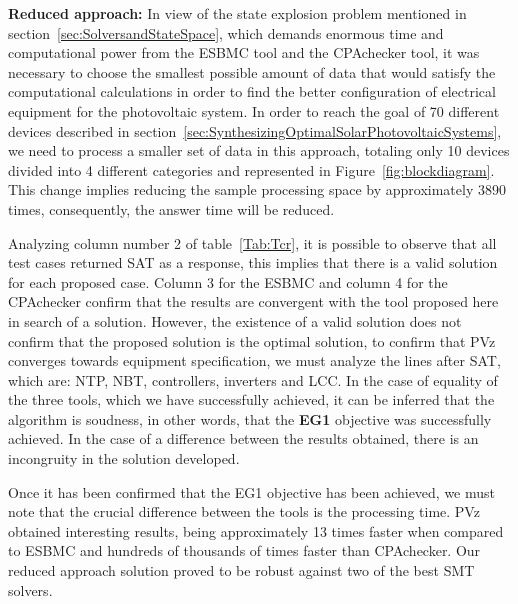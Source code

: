 \documentclass[10pt,journal,compsoc]{IEEEtran}
\begin{document}

\textbf{Reduced approach:} In view of the state explosion problem mentioned in section~\ref{sec:SolversandStateSpace}, which demands enormous time and computational power from the ESBMC tool and the CPAchecker tool, it was necessary to choose the smallest possible amount of data that would satisfy the computational calculations in order to find the better configuration of electrical equipment for the photovoltaic system. In order to reach the goal of 70 different devices described in section~\ref{sec:SynthesizingOptimalSolarPhotovoltaicSystems}, we need to process a smaller set of data in this approach, totaling only 10 devices divided into 4 different categories and represented in Figure~\ref{fig:blockdiagram}. This change implies reducing the sample processing space by approximately 3890 times, consequently, the answer time will be reduced.

Analyzing column number 2 of table~\ref{Tab:Tcr}, it is possible to observe that all test cases returned SAT as a response, this implies that there is a valid solution for each proposed case. Column 3 for the ESBMC and column 4 for the CPAchecker confirm that the results are convergent with the tool proposed here in search of a solution. However, the existence of a valid solution does not confirm that the proposed solution is the optimal solution, to confirm that PVz converges towards equipment specification, we must analyze the lines after SAT, which are: NTP, NBT, controllers, inverters and LCC. In the case of equality of the three tools, which we have successfully achieved, it can be inferred that the algorithm is soudness, in other words, that the \textbf{EG1} objective was successfully achieved. In the case of a difference between the results obtained, there is an incongruity in the solution developed.

Once it has been confirmed that the EG1 objective has been achieved, we must note that the crucial difference between the tools is the processing time. PVz obtained interesting results, being approximately 13 times faster when compared to ESBMC and hundreds of thousands of times faster than CPAchecker. Our reduced approach solution proved to be robust against two of the best SMT solvers.


\end{document}
